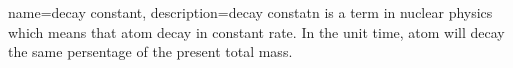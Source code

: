 {
    name=decay constant,
    description={decay constatn is a term in nuclear physics which means that atom decay in constant rate. In the unit time, atom will decay the same persentage of the present total mass.}
}
